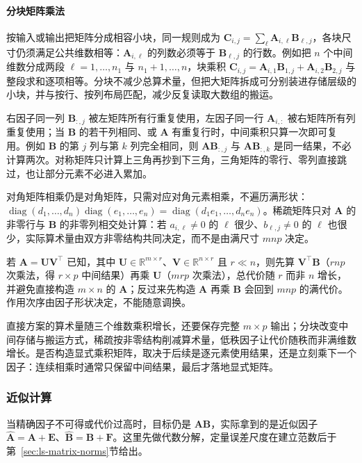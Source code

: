 \paragraph{分块矩阵乘法}

按输入或输出把矩阵分成相容小块，同一规则成为 $\bm C_{i,j}=\sum_\ell\bm A_{i,\ell}\bm B_{\ell,j}$，各块尺寸仍须满足公共维数相等：$\bm A_{i,\ell}$ 的列数必须等于 $\bm B_{\ell,j}$ 的行数。例如把 $n$ 个中间维数分成两段 $\ell=1,\dots,n_1$ 与 $n_1+1,\dots,n$，块乘积 $\bm C_{i,j}=\bm A_{i,1}\bm B_{1,j}+\bm A_{i,2}\bm B_{2,j}$ 与整段求和逐项相等。分块不减少总算术量，但把大矩阵拆成可分别装进存储层级的小块，并与按行、按列布局匹配，减少反复读取大数组的搬运。

右因子同一列 $\bm B_{:,j}$ 被左矩阵所有行重复使用，左因子同一行 $\bm A_{i,:}$ 被右矩阵所有列重复使用；当 $\bm B$ 的若干列相同、或 $\bm A$ 有重复行时，中间乘积只算一次即可复用。例如 $\bm B$ 的第 $j$ 列与第 $k$ 列完全相同，则 $\bm A\bm B_{:,j}$ 与 $\bm A\bm B_{:,k}$ 是同一结果，不必计算两次。对称矩阵只计算上三角再抄到下三角，三角矩阵的零行、零列直接跳过，也让部分元素不必进入累加。

对角矩阵相乘仍是对角矩阵，只需对应对角元素相乘，不遍历满形状：$\operatorname{diag}(d_1,\dots,d_n)\operatorname{diag}(e_1,\dots,e_n)=\operatorname{diag}(d_1e_1,\dots,d_ne_n)$。稀疏矩阵只对 $\bm A$ 的非零行与 $\bm B$ 的非零列相交处计算：若 $a_{i,\ell}\neq0$ 的 $\ell$ 很少、$b_{\ell,j}\neq0$ 的 $\ell$ 也很少，实际算术量由双方非零结构共同决定，而不是由满尺寸 $mnp$ 决定。

若 $\bm A=\bm U\bm V^\top$ 已知，其中 $\bm U\in\mathbb R^{m\times r}$、$\bm V\in\mathbb R^{n\times r}$ 且 $r\ll n$，则先算 $\bm V^\top\bm B$（$rnp$ 次乘法，得 $r\times p$ 中间结果）再乘 $\bm U$（$mrp$ 次乘法），总代价随 $r$ 而非 $n$ 增长，并避免直接构造 $m\times n$ 的 $\bm A$；反过来先构造 $\bm A$ 再乘 $\bm B$ 会回到 $mnp$ 的满代价。作用次序由因子形状决定，不能随意调换。

直接方案的算术量随三个维数乘积增长，还要保存完整 $m\times p$ 输出；分块改变中间存储与搬运方式，稀疏按非零结构削减算术量，低秩因子让代价随秩而非满维数增长。是否构造显式乘积矩阵，取决于后续是逐元素使用结果，还是立刻乘下一个因子：连续相乘时通常只保留中间结果，最后才落地显式矩阵。

\subsubsection{近似计算}

当精确因子不可得或代价过高时，目标仍是 $\bm A\bm B$，实际拿到的是近似因子 $\widehat{\bm A}=\bm A+\bm E$、$\widehat{\bm B}=\bm B+\bm F$。这里先做代数分解，定量误差尺度在建立范数后于第~\ref{sec:ls-matrix-norms}节给出。


